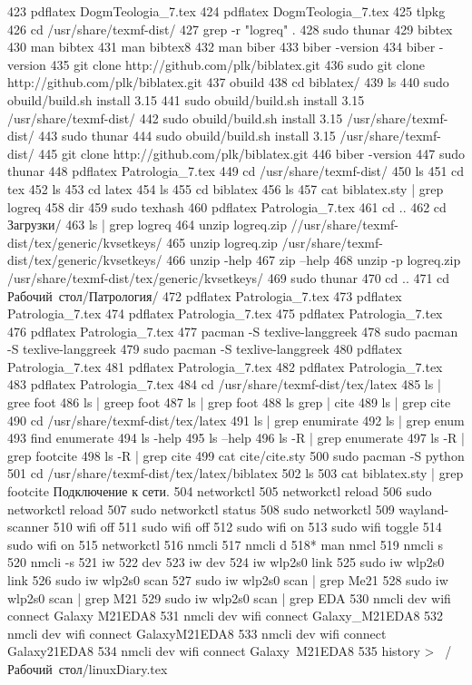   423  pdflatex DogmTeologia_7.tex
  424  pdflatex DogmTeologia_7.tex
  425  tlpkg
  426  cd /usr/share/texmf-dist/
  427  grep -r "logreq" .
  428  sudo thunar
  429  bibtex
  430  man bibtex
  431  man bibtex8
  432  man biber
  433  biber -version
  434  biber -version
  435  git clone http://github.com/plk/biblatex.git
  436  sudo git clone http://github.com/plk/biblatex.git
  437  obuild
  438  cd biblatex/
  439  ls
  440  sudo obuild/build.sh install 3.15
  441  sudo obuild/build.sh install 3.15 /usr/share/texmf-dist/
  442  sudo obuild/build.sh install 3.15 /usr/share/texmf-dist/
  443  sudo thunar
  444  sudo obuild/build.sh install 3.15 /usr/share/texmf-dist/
  445  git clone http://github.com/plk/biblatex.git
  446  biber -version
  447  sudo thunar
  448  pdflatex Patrologia_7.tex 
  449  cd /usr/share/texmf-dist/
  450  ls
  451  cd tex
  452  ls
  453  cd latex
  454  ls
  455  cd biblatex
  456  ls
  457  cat biblatex.sty | grep logreq
  458  dir
  459  sudo texhash
  460  pdflatex Patrologia_7.tex 
  461  cd ..
  462  cd Загрузки/
  463  ls | grep logreq
  464  unzip logreq.zip //usr/share/texmf-dist/tex/generic/kvsetkeys/
  465  unzip logreq.zip /usr/share/texmf-dist/tex/generic/kvsetkeys/
  466  unzip -help
  467  zip --help
  468  unzip -p logreq.zip /usr/share/texmf-dist/tex/generic/kvsetkeys/
  469  sudo thunar
  470  cd ..
  471  cd Рабочий\ стол/Патрология/
  472  pdflatex Patrologia_7.tex 
  473  pdflatex Patrologia_7.tex 
  474  pdflatex Patrologia_7.tex 
  475  pdflatex Patrologia_7.tex 
  476  pdflatex Patrologia_7.tex 
  477  pacman -S texlive-langgreek 
  478  sudo pacman -S texlive-langgreek 
  479  sudo pacman -S texlive-langgreek 
  480  pdflatex Patrologia_7.tex 
  481  pdflatex Patrologia_7.tex 
  482  pdflatex Patrologia_7.tex 
  483  pdflatex Patrologia_7.tex 
  484  cd /usr/share/texmf-dist/tex/latex
  485  ls | gree foot
  486  ls | greep foot
  487  ls | grep foot
  488  ls grep | cite
  489  ls | grep cite
  490  cd /usr/share/texmf-dist/tex/latex
  491  ls | grep enumirate
  492  ls | grep enum
  493  find enumerate
  494  ls -help
  495  ls --help
  496  ls -R | grep enumerate
  497  ls -R | grep footcite
  498  ls -R | grep cite
  499  cat cite/cite.sty 
  500  sudo pacman -S python
  501  cd /usr/share/texmf-dist/tex/latex/biblatex
  502  ls
  503  cat biblatex.sty | grep footcite
Подключение к сети.
  504  networkctl 
  505  networkctl reload 
  506  sudo networkctl reload 
  507  sudo networkctl status
  508  sudo networkctl
  509  wayland-scanner 
  510  wifi off
  511  sudo wifi off
  512  sudo wifi on
  513  sudo wifi toggle
  514  sudo wifi on
  515  networkctl 
  516  nmcli 
  517  nmcli d
  518* man nmcl
  519  nmcli s
  520  nmcli -s
  521  iw 
  522  dev
  523  iw dev
  524  iw wlp2s0 link
  525  sudo iw wlp2s0 link
  526  sudo iw wlp2s0 scan
  527  sudo iw wlp2s0 scan | grep Me21
  528  sudo iw wlp2s0 scan | grep M21
  529  sudo iw wlp2s0 scan | grep EDA
  530  nmcli dev wifi connect Galaxy M21EDA8
  531  nmcli dev wifi connect Galaxy_M21EDA8
  532  nmcli dev wifi connect GalaxyM21EDA8
  533  nmcli dev wifi connect Galaxy\M21EDA8
  534  nmcli dev wifi connect Galaxy\ M21EDA8
  535  history > ~/Рабочий\ стол/linuxDiary.tex

